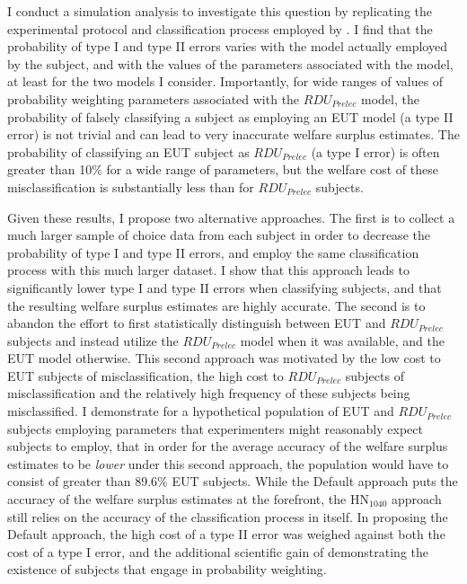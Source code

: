 \documentclass[../main.tex]{subfiles}
\begin{document}
I conduct a simulation analysis to investigate this question by replicating the experimental protocol and classification process employed by \textcite{Harrison2016}.
I find that the probability of type I and type II errors varies with the model actually employed by the subject, and with the values of the parameters associated with the model, at least for the two models I consider.
Importantly, for wide ranges of values of probability weighting parameters associated with the $\mathit{RDU_{Prelec}}$ model, the probability of falsely classifying a subject as employing an EUT model (a type II error) is not trivial and can lead to very inaccurate welfare surplus estimates.
The probability of classifying an EUT subject as $\mathit{RDU_{Prelec}}$ (a type I error) is often greater than 10\% for a wide range of parameters, but the welfare cost of these misclassification is substantially less than for $\mathit{RDU_{Prelec}}$ subjects.

Given these results, I propose two alternative approaches.
The first is to collect a much larger sample of choice data from each subject in order to decrease the probability of type I and type II errors, and employ the same classification process with this much larger dataset.
I show that this approach leads to significantly lower type I and type II errors when classifying subjects, and that the resulting welfare surplus estimates are highly accurate.
The second is to abandon the effort to first statistically distinguish between EUT and $\mathit{RDU_{Prelec}}$ subjects and instead utilize the $\mathit{RDU_{Prelec}}$ model when it was available, and the EUT model otherwise.
This second approach was motivated by the low cost to EUT subjects of misclassification, the high cost to $\mathit{RDU_{Prelec}}$ subjects of misclassification and the relatively high frequency of these subjects being misclassified.
I demonstrate for a hypothetical population of EUT and $\mathit{RDU_{Prelec}}$ subjects employing parameters that experimenters might reasonably expect subjects to employ, that in order for the average accuracy of the welfare surplus estimates to be \textit{lower} under this second approach, the population would have to consist of greater than 89.6\% EUT subjects.
While the Default approach puts the accuracy of the welfare surplus estimates at the forefront, the $\text{HN}_{1040}$ approach still relies on the accuracy of the classification process in itself. 
In proposing the Default approach, the high cost of a type II error was weighed against both the cost of a type I error, and the additional scientific gain of demonstrating the existence of subjects that engage in probability weighting.
\end{document}
